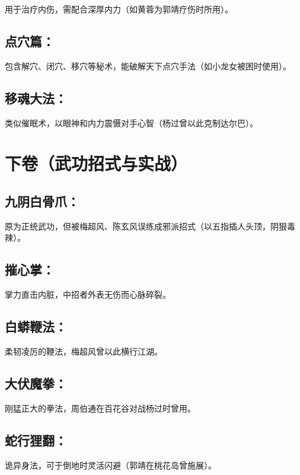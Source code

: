\documentclass[doctor, vlined]{DissertUESTC}
\begin{document}
	用于治疗内伤，需配合深厚内力（如黄蓉为郭靖疗伤时所用）。

	\subsection{点穴篇：}

	包含解穴、闭穴、移穴等秘术，能破解天下点穴手法（如小龙女被困时使用）。

	\subsection{移魂大法：}

	类似催眠术，以眼神和内力震慑对手心智（杨过曾以此克制达尔巴）。

	\section{下卷（武功招式与实战）}
	
	\subsection{九阴白骨爪：}

	原为正统武功，但被梅超风、陈玄风误练成邪派招式（以五指插人头顶，阴狠毒辣）。

	\subsection{摧心掌：}

	掌力直击内脏，中招者外表无伤而心脉碎裂。

	\subsection{白蟒鞭法：}

	柔韧凌厉的鞭法，梅超风曾以此横行江湖。

	\subsection{大伏魔拳：}

	刚猛正大的拳法，周伯通在百花谷对战杨过时曾用。

	\subsection{蛇行狸翻：}

	诡异身法，可于倒地时灵活闪避（郭靖在桃花岛曾施展）。
\end{document}
